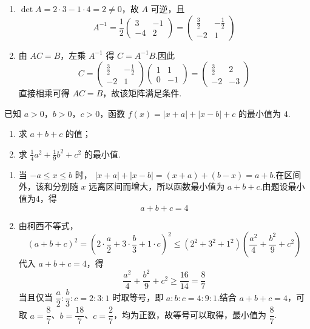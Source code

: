 \begin{solution}
\begin{enumerate}
\item \(\det A=2\cdot3-1\cdot4=2\neq0\)，故 \(A\) 可逆，且
\[
A^{-1}=\frac1{2}\begin{pmatrix}3&-1\\-4&2\end{pmatrix}
=\begin{pmatrix}\frac32&-\frac12\\-2&1\end{pmatrix}
\]

\item 由 \(AC=B\)，左乘 \(A^{-1}\) 得 \(C=A^{-1}B\).因此
\[
C=\begin{pmatrix}\frac32&-\frac12\\-2&1\end{pmatrix}
\begin{pmatrix}1&1\\0&-1\end{pmatrix}
=\begin{pmatrix}\frac32&2\\-2&-3\end{pmatrix}
\]
直接相乘可得 \(AC=B\)，故该矩阵满足条件.
\end{enumerate}
\end{solution}

\begin{problem}
已知 \(a > 0\)，\(b > 0\)，\(c > 0\)，函数 \(f(x) = |x + a| + |x - b| + c\) 的最小值为 \(4\).
\begin{enumerate}
\item 求 \(a + b + c\) 的值；
\item 求 \(\frac{1}{4}a^{2}+\frac{1}{9}b^{2}+c^{2}\) 的最小值.
\end{enumerate}
\end{problem}

\begin{solution}
\begin{enumerate}
\item 当 \(-a\leqslant x\leqslant b\) 时，
\(|x+a|+|x-b|=(x+a)+(b-x)=a+b\).在区间外，该和分别随 \(x\) 远离区间而增大，所以函数最小值为 \(a+b+c\).由题设最小值为4，得
\[
a+b+c=4
\]

\item 由柯西不等式，
\[
(a+b+c)^2=\left(2\cdot\frac a2+3\cdot\frac b3+1\cdot c\right)^2
\leqslant(2^2+3^2+1^2)\left(\frac{a^2}{4}+\frac{b^2}{9}+c^2\right)
\]
代入 \(a+b+c=4\)，得
\[
\frac{a^2}{4}+\frac{b^2}{9}+c^2\geqslant\frac{16}{14}=\frac87
\]
当且仅当 \(\dfrac a2:\dfrac b3:c=2:3:1\) 时取等号，即 \(a:b:c=4:9:1\).结合 \(a+b+c=4\)，可取
\(a=\dfrac87\)、\(b=\dfrac{18}{7}\)、\(c=\dfrac27\)，均为正数，故等号可以取得，最小值为 \(\dfrac87\).
\end{enumerate}
\end{solution}
